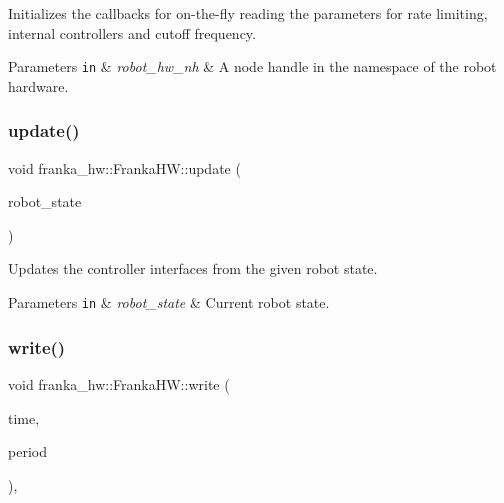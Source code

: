 Initializes the callbacks for on-\/the-\/fly reading the parameters for rate limiting, internal controllers and cutoff frequency.


\begin{DoxyParams}[1]{Parameters}
\mbox{\tt in}  & {\em robot\+\_\+hw\+\_\+nh} & A node handle in the namespace of the robot hardware. \\
\hline
\end{DoxyParams}
\mbox{\label{classfranka__hw_1_1_franka_h_w_ad8f348151b93a7eebc9ef45a702a29ee}} 
\subsubsection{\texorpdfstring{update()}{update()}}
{\footnotesize\ttfamily void franka\+\_\+hw\+::\+Franka\+H\+W\+::update (\begin{DoxyParamCaption}\item[{const franka\+::\+Robot\+State \&}]{robot\+\_\+state }\end{DoxyParamCaption})\hspace{0.3cm}{\ttfamily [virtual]}}

Updates the controller interfaces from the given robot state.


\begin{DoxyParams}[1]{Parameters}
\mbox{\tt in}  & {\em robot\+\_\+state} & Current robot state. \\
\hline
\end{DoxyParams}
\mbox{\label{classfranka__hw_1_1_franka_h_w_afcdec49ec8bb07c48ed3d77ea2cd4e46}} 
\subsubsection{\texorpdfstring{write()}{write()}}
{\footnotesize\ttfamily void franka\+\_\+hw\+::\+Franka\+H\+W\+::write (\begin{DoxyParamCaption}\item[{const ros\+::\+Time \&}]{time,  }\item[{const ros\+::\+Duration \&}]{period }\end{DoxyParamCaption})\hspace{0.3cm}{\ttfamily [override]}, {\ttfamily [virtual]}}

